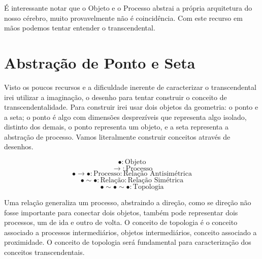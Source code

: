 \documentclass[10pt,a4paper]{report}
\begin{document}

\hspace{\baselineskip}

É interessante notar que o Objeto e o Processo abstrai a própria arquitetura do nosso cérebro, muito provavelmente não é coincidência. Com este recurso em mãos podemos tentar entender o transcendental.




\section{Abstração de Ponto e Seta}

\hspace{\baselineskip}

Visto os poucos recursos e a dificuldade inerente de caracterizar o transcendental irei utilizar a imaginação, o desenho para tentar construir o conceito de transcendentalidade. Para construir irei usar dois objetos da geometria: o ponto e a seta; o ponto é algo com dimensões desprezíveis que representa algo isolado, distinto dos demais, o ponto representa um objeto, e a seta representa a abstração de processo. Vamos literalmente construir conceitos através de desenhos.

$$ \bullet : \text{Objeto} $$
$$ \rightarrow : \text{Processo} $$
$$ \bullet \rightarrow \bullet : \text{Processo} : \text{Relação Antisimétrica} $$
$$ \bullet \sim \bullet : \text{Relação} : \text{Relação Simétrica} $$
$$ \bullet \sim \bullet \sim \bullet : \text{Topologia} $$

Uma relação generaliza um processo, abstraindo a direção, como se direção não fosse importante para conectar dois objetos, também pode representar dois processos, um de ida e outro de volta. O conceito de topologia é o conceito associado a processos intermediários, objetos intermediários, conceito associado a proximidade. O conceito de topologia será fundamental para caracterização dos conceitos transcendentais.
\end{document}
